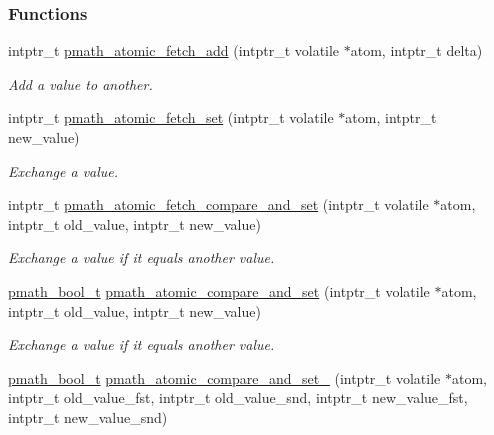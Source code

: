 \subsubsection*{Functions}
\begin{CompactItemize}
\item 
intptr\_\-t \hyperlink{group__atomic__ops_ge84bfddad2c018c6273b43164e6064ab}{pmath\_\-atomic\_\-fetch\_\-add} (intptr\_\-t volatile $\ast$atom, intptr\_\-t delta)
\begin{CompactList}\small\item\em Add a value to another. \item\end{CompactList}\item 
intptr\_\-t \hyperlink{group__atomic__ops_gc39a86500a2344c9c7f7f42d2d069334}{pmath\_\-atomic\_\-fetch\_\-set} (intptr\_\-t volatile $\ast$atom, intptr\_\-t new\_\-value)
\begin{CompactList}\small\item\em Exchange a value. \item\end{CompactList}\item 
intptr\_\-t \hyperlink{group__atomic__ops_g0eb65b0a5caacf019bf1c97616f69603}{pmath\_\-atomic\_\-fetch\_\-compare\_\-and\_\-set} (intptr\_\-t volatile $\ast$atom, intptr\_\-t old\_\-value, intptr\_\-t new\_\-value)
\begin{CompactList}\small\item\em Exchange a value if it equals another value. \item\end{CompactList}\item 
\hyperlink{group__general__types_gc92090cb0b56345d6c379ed2341d4ef4}{pmath\_\-bool\_\-t} \hyperlink{group__atomic__ops_g8e2ec6134e5f1161aed5c890abb2e53b}{pmath\_\-atomic\_\-compare\_\-and\_\-set} (intptr\_\-t volatile $\ast$atom, intptr\_\-t old\_\-value, intptr\_\-t new\_\-value)
\begin{CompactList}\small\item\em Exchange a value if it equals another value. \item\end{CompactList}\item 
\hyperlink{group__general__types_gc92090cb0b56345d6c379ed2341d4ef4}{pmath\_\-bool\_\-t} \hyperlink{group__atomic__ops_g868adc2a74d7aafbb0670922f61a21cc}{pmath\_\-atomic\_\-compare\_\-and\_\-set\_} (intptr\_\-t volatile $\ast$atom, intptr\_\-t old\_\-value\_\-fst, intptr\_\-t old\_\-value\_\-snd, intptr\_\-t new\_\-value\_\-fst, intptr\_\-t new\_\-value\_\-snd)

\end{CompactItemize}
